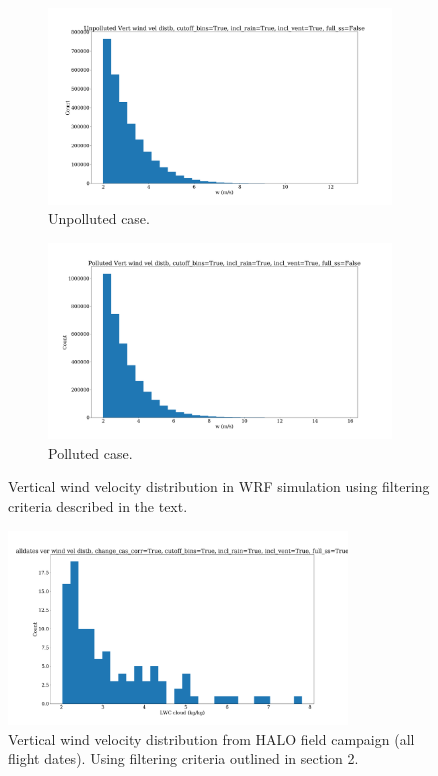 \documentclass{article}
\begin{document}
\begin{figure}[ht]
	\centering
	\begin{subfigure}{0.7\textwidth}
		\includegraphics[width=\textwidth]{revmywrf/v9_w_hist_Unpolluted_figure.png}
		\caption{Unpolluted case.}
		\label{wrfwhistunpoll}
	\end{subfigure}
	\begin{subfigure}{0.7\textwidth}
		\includegraphics[width=\textwidth]{revmywrf/v9_w_hist_Polluted_figure.png}
		\caption{Polluted case.}
		\label{wrfwhistpoll}
	\end{subfigure}
	\caption{Vertical wind velocity distribution in WRF simulation using filtering criteria described in the text.}
	\label{wrfwhist}
\end{figure}
\begin{figure}[ht]
    \centering
    \includegraphics[width=9cm]{revhalo/v24_w_hist_cas_alldates_figure.png}
    \caption{Vertical wind velocity distribution from HALO field campaign (all flight dates). Using filtering criteria outlined in section 2.}
    \label{halowhist}
\end{figure}
\end{document}
